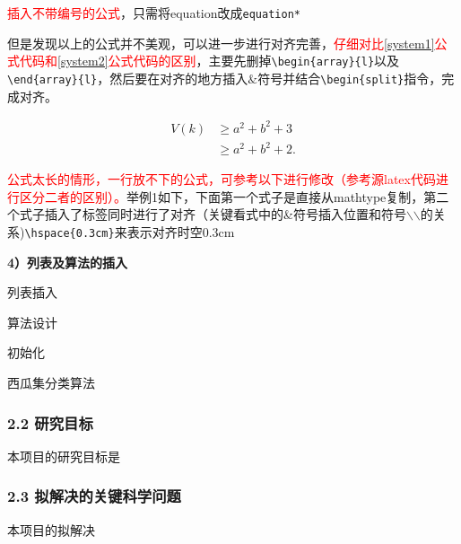 \textcolor{red}{插入不带编号的公式}，只需将equation改成\verb+equation*+

但是发现以上的公式并不美观，可以进一步进行对齐完善，\textcolor{red}{仔细对比\eqref{system1}公式代码和\eqref{system2}公式代码的区别}，主要先删掉\verb+\begin{array}{l}+以及\verb+\end{array}{l}+，然后要在对齐的地方插入$\&$符号并结合\verb+\begin{split}+指令，完成对齐。

\begin{equation}\label{system2}
\begin{split}
V(k) &\ge a^2+b^2+3\\
 &\ge a^2+b^2+2.
\end{split}
\end{equation}

\textcolor{red}{公式太长的情形，一行放不下的公式，可参考以下进行修改（参考源latex代码进行区分二者的区别）。}举例1如下，下面第一个式子是直接从mathtype复制，第二个式子插入了标签同时进行了对齐（关键看式中的\&符号插入位置和符号$\backslash$$\backslash$的关系)\verb+\hspace{0.3cm}+来表示对齐时空0.3cm


\noindent\textbf{4）列表及算法的插入}

列表插入

\begin{table}[h]
    \caption{工作进度安排}
  \centering
  \label{gra_process}
  \end{table}
  
算法设计

  \begin{algorithm}[H]
      初始化\;
      \caption{西瓜集分类算法}
  \end{algorithm}
  


\subsubsection{2.2 研究目标}
本项目的研究目标是

\subsubsection{2.3 拟解决的关键科学问题}


本项目的拟解决



